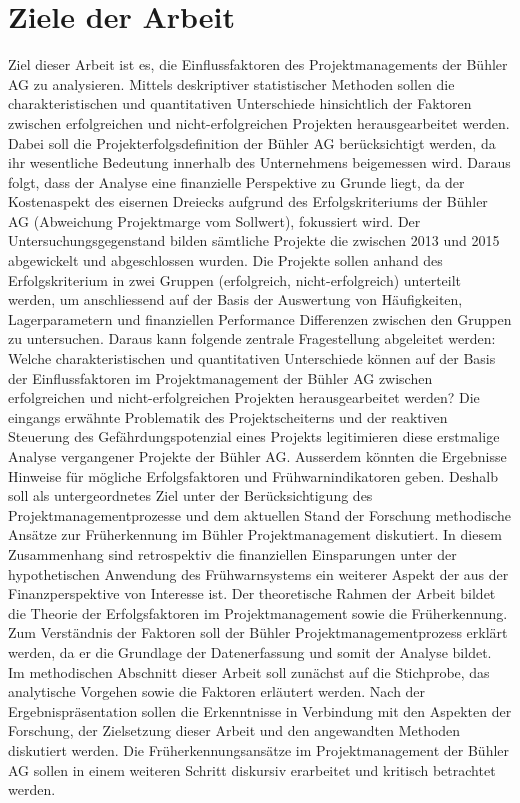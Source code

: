 \section{Ziele der Arbeit}\label{sec:zda}
Ziel dieser Arbeit ist es, die Einflussfaktoren des Projektmanagements der Bühler AG zu analysieren. Mittels deskriptiver statistischer Methoden sollen die charakteristischen und quantitativen Unterschiede hinsichtlich der Faktoren zwischen erfolgreichen und nicht-erfolgreichen Projekten herausgearbeitet werden. Dabei soll die Projekterfolgsdefinition der Bühler AG berücksichtigt werden, da ihr wesentliche Bedeutung innerhalb des Unternehmens beigemessen wird. Daraus folgt, dass der Analyse eine finanzielle Perspektive zu Grunde liegt, da der Kostenaspekt des eisernen Dreiecks aufgrund des Erfolgskriteriums der Bühler AG (Abweichung Projektmarge vom Sollwert), fokussiert wird. Der Untersuchungsgegenstand bilden sämtliche Projekte die zwischen 2013 und 2015 abgewickelt und abgeschlossen wurden. Die Projekte sollen anhand des Erfolgskriterium in zwei Gruppen (erfolgreich, nicht-erfolgreich) unterteilt  werden, um anschliessend auf der Basis der Auswertung von  Häufigkeiten, Lagerparametern und finanziellen Performance Differenzen zwischen den Gruppen zu untersuchen. Daraus kann folgende zentrale Fragestellung abgeleitet werden: 
\newline\newline
Welche charakteristischen und quantitativen Unterschiede können auf der Basis der Einflussfaktoren im Projektmanagement der Bühler AG zwischen erfolgreichen und nicht-erfolgreichen Projekten herausgearbeitet werden? 
\newline\newline
Die eingangs erwähnte Problematik des Projektscheiterns und der reaktiven Steuerung des Gefährdungspotenzial eines Projekts legitimieren diese erstmalige Analyse vergangener Projekte der Bühler AG. Ausserdem könnten die Ergebnisse Hinweise für mögliche Erfolgsfaktoren und Frühwarnindikatoren geben. Deshalb soll als untergeordnetes Ziel unter der Berücksichtigung des Projektmanagementprozesse und dem aktuellen Stand der Forschung methodische Ansätze zur Früherkennung im Bühler Projektmanagement diskutiert. In diesem Zusammenhang sind retrospektiv die finanziellen Einsparungen unter der hypothetischen Anwendung des Frühwarnsystems ein weiterer Aspekt der aus der Finanzperspektive von Interesse ist. 
\newline\newline
Der theoretische Rahmen der Arbeit bildet die Theorie der Erfolgsfaktoren im Projektmanagement sowie die Früherkennung. Zum Verständnis der Faktoren soll der Bühler Projektmanagementprozess erklärt werden, da er die Grundlage der Datenerfassung und somit der Analyse bildet. Im methodischen Abschnitt dieser Arbeit soll zunächst auf die Stichprobe, das analytische Vorgehen sowie die Faktoren erläutert werden. Nach der Ergebnispräsentation sollen die Erkenntnisse in Verbindung mit den Aspekten der Forschung, der Zielsetzung dieser Arbeit und den angewandten Methoden diskutiert werden. Die Früherkennungsansätze im Projektmanagement der Bühler AG sollen in einem weiteren Schritt diskursiv erarbeitet und kritisch betrachtet werden.

